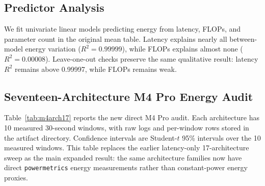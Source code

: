 \documentclass[conference]{IEEEtran}
\begin{document}
\subsection{Predictor Analysis}

We fit univariate linear models predicting energy from latency, FLOPs, and
parameter count in the original mean table. Latency explains nearly all
between-model energy variation ($R^2=0.99999$), while FLOPs explains almost
none ($R^2=0.00008$). Leave-one-out checks preserve the same qualitative
result: latency $R^2$ remains above 0.99997, while FLOPs remains weak.

\subsection{Seventeen-Architecture M4 Pro Energy Audit}

Table~\ref{tab:m4arch17} reports the new direct M4 Pro audit. Each architecture
has 10 measured 30-second windows, with raw logs and per-window rows stored in
the artifact directory. Confidence intervals are Student-$t$ 95\% intervals
over the 10 measured windows. This table replaces the earlier latency-only
17-architecture sweep as the main expanded result: the same architecture
families now have direct \texttt{powermetrics} energy measurements rather than
constant-power energy proxies.
\end{document}
